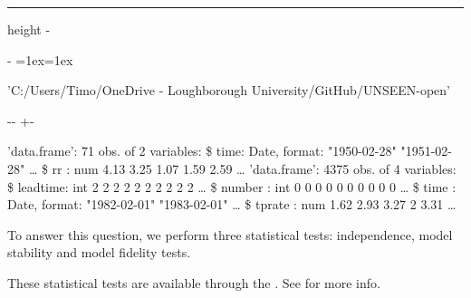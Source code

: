 \documentclass[letterpaper,10pt,english]{sphinxmanual}
\makeatletter
\newenvironment{nbsphinxfancyoutput}{%
    \let\sphinxincludegraphics\nbsphinxincludegraphics
    \nbsphinx@image@maxheight\textheight
    \advance\nbsphinx@image@maxheight -2\fboxsep   %
    \advance\nbsphinx@image@maxheight -2\fboxrule  %
    \advance\nbsphinx@image@maxheight -\baselineskip
\def\nbsphinxfcolorbox{\spx@fcolorbox{nbsphinx-code-border}{white}}%
\def\FrameCommand{\nbsphinxfcolorbox\nbsphinxfancyaddprompt\@empty}%
\def\FirstFrameCommand{\nbsphinxfcolorbox\nbsphinxfancyaddprompt\sphinxVerbatim@Continues}%
\def\MidFrameCommand{\nbsphinxfcolorbox\sphinxVerbatim@Continued\sphinxVerbatim@Continues}%
\def\LastFrameCommand{\nbsphinxfcolorbox\sphinxVerbatim@Continued\@empty}%
\MakeFramed{\advance\hsize-\width\@totalleftmargin\z@\linewidth\hsize\@setminipage}%
\lineskip=1ex\lineskiplimit=1ex\raggedright%
}{\par\unskip\@minipagefalse\endMakeFramed}
\def\nbsphinxfancyaddprompt{\ifvoid\nbsphinxpromptbox\else
    \kern\fboxrule\kern\fboxsep
    \copy\nbsphinxpromptbox
    \kern-\ht\nbsphinxpromptbox\kern-\dp\nbsphinxpromptbox
    \kern-\fboxsep\kern-\fboxrule\nointerlineskip
    \fi}
\newlength\nbsphinxcodecellspacing
\newcommand*{\nbsphinxincludegraphics}[2][]{%
    \gdef\spx@includegraphics@options{#1}%
    \setbox\spx@image@box\hbox{\texttt{[image: \#2]}}%
    \in@false
    \ifdim \wd\spx@image@box>\linewidth
      \g@addto@macro\spx@includegraphics@options{,width=\linewidth}%
      \in@true
    \fi
    \ifdim \ht\spx@image@box>\nbsphinx@image@maxheight
      \g@addto@macro\spx@includegraphics@options{,height=\nbsphinx@image@maxheight}%
      \in@true
    \fi
    \ifin@
      \g@addto@macro\spx@includegraphics@options{,keepaspectratio}%
    \fi
    \setbox\spx@image@box\box\voidb@x %
    \expandafter\includegraphics\expandafter[\spx@includegraphics@options]{#2}%
}%
\makeatother
\begin{document}
\hrule height -\fboxrule\relax
\vspace{\nbsphinxcodecellspacing}

\makeatletter\setbox\nbsphinxpromptbox\box\voidb@x\makeatother

\begin{nbsphinxfancyoutput}
'C:/Users/Timo/OneDrive - Loughborough University/GitHub/UNSEEN-open'
\end{nbsphinxfancyoutput}

{

\kern-\sphinxverbatimsmallskipamount\kern-\baselineskip
\kern+\FrameHeightAdjust\kern-\fboxrule
\vspace{\nbsphinxcodecellspacing}

\begin{sphinxVerbatim}[commandchars=\\\{\}]
'data.frame':   71 obs. of  2 variables:
 \$ time: Date, format: "1950-02-28" "1951-02-28" {\ldots}
 \$ rr  : num  4.13 3.25 1.07 1.59 2.59 {\ldots}
'data.frame':   4375 obs. of  4 variables:
 \$ leadtime: int  2 2 2 2 2 2 2 2 2 2 {\ldots}
 \$ number  : int  0 0 0 0 0 0 0 0 0 0 {\ldots}
 \$ time    : Date, format: "1982-02-01" "1983-02-01" {\ldots}
 \$ tprate  : num  1.62 2.93 3.27 2 3.31 {\ldots}
\end{sphinxVerbatim}
}


\begin{DUlineblock}{0em}
\item[] To answer this question, we perform three statistical tests: independence, model stability and model fidelity tests.
\item[] These statistical tests are available through the . See  for more info.
\end{DUlineblock}

{
\begin{sphinxVerbatim}[commandchars=\\\{\}]
\llap{\color{nbsphinxin}[2]:\,\hspace{\fboxrule}\hspace{\fboxsep}}
\end{sphinxVerbatim}
}
\end{document}
